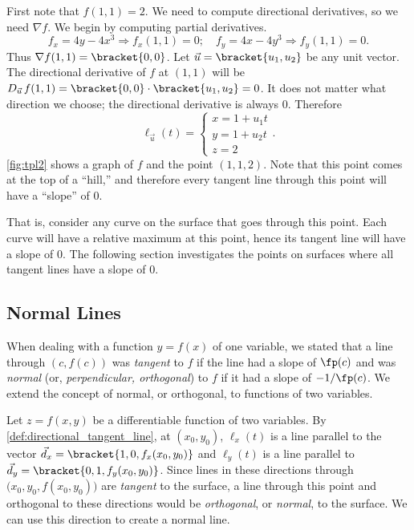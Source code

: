 {First note that $f(1,1) = 2$. We need to compute directional derivatives, so we need $\nabla f$. We begin by computing partial derivatives.
\[
f_x = 4y-4x^3 \Rightarrow f_x(1,1) = 0;\quad f_y = 4x-4y^3\Rightarrow f_y(1,1) = 0.
\]
Thus $\nabla f(1,1) =\bracket{0,0}$. Let $\vec u =\bracket{u_1,u_2}$ be any unit vector. The directional derivative of $f$ at $(1,1)$ will be $D_{\vec u\,}f(1,1) =\bracket{0,0}\cdot\bracket{u_1,u_2}= 0$. It does not matter what direction we choose; the directional derivative is always 0. Therefore
%
%
\[
\ell_{\vec u}(t) = \begin{cases}x= 1 +u_1t\\ y = 1+ u_2 t\\ z= 2\end{cases}.
\]
\autoref{fig:tpl2} shows a graph of $f$ and the point $(1,1,2)$. Note that this point comes at the top of a ``hill,'' and therefore every tangent line through this point will have a ``slope'' of 0. 

That is, consider any curve on the surface that goes through this point. Each curve will have a relative maximum at this point, hence its tangent line will have a slope of 0. The following section investigates the points on surfaces where all tangent lines have a slope of 0.}

\subsection{Normal Lines}

When dealing with a function $y=f(x)$ of one variable, we stated that a line through $(c,f(c))$ was \textit{tangent} to $f$ if the line had a slope of $\fp(c)$ and was \textit{normal} (or, \textit{perpendicular, orthogonal}) to $f$ if it had a slope of $-1/\fp(c)$. We extend the concept of normal, or orthogonal, to functions of two variables. 

Let $z=f(x,y)$ be a differentiable function of two variables. By \autoref{def:directional_tangent_line}, at $(x_0,y_0)$, $\ell_x(t)$ is a line parallel to the vector $\vec d_x=\bracket{1,0,f_x(x_0,y_0)}$ and $\ell_y(t)$ is a line parallel to $\vec d_y=\bracket{0,1,f_y(x_0,y_0)}$. Since lines in these directions through $\big(x_0,y_0,f(x_0,y_0)\big)$ are \textit{tangent} to the surface, a line through this point and orthogonal to these directions would be \textit{orthogonal}, or \textit{normal}, to the surface. We can use this direction to create a normal line.

